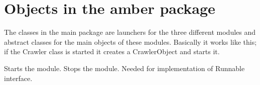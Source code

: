 \section{Objects in the amber package}

The classes in the main package are launchers for the three different modules
and abstract classes for the main objects of these modules. Basically it works
like this; if the Crawler class is started it creates a CrawlerObject and
starts it.

\begin{classmetadata}
\end{classmetadata}
\begin{interface}
    {Starts the module.}
    {Stops the module.}
    {Needed for implementation of Runnable interface.}
\end{interface}




\begin{classmetadata}
\end{classmetadata}

\begin{interface}
\end{interface}




\begin{classmetadata}
\end{classmetadata}

\begin{interface}
\end{interface}




\begin{classmetadata}
\end{classmetadata}

\begin{interface}
\end{interface}



